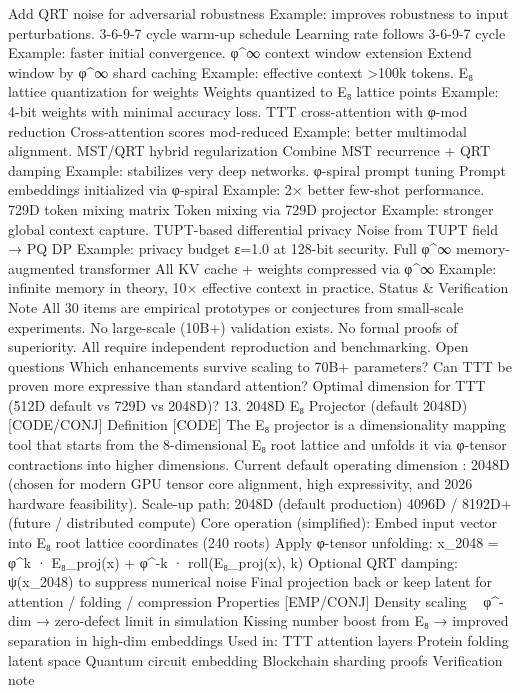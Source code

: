 {{{{{{Add QRT noise for adversarial robustness
Example: improves robustness to input perturbations.
3-6-9-7 cycle warm-up schedule
Learning rate follows 3-6-9-7 cycle
Example: faster initial convergence.
φ^∞ context window extension
Extend window by φ^∞ shard caching
Example: effective context >100k tokens.
E₈ lattice quantization for weights
Weights quantized to E₈ lattice points
Example: 4-bit weights with minimal accuracy loss.
TTT cross-attention with φ-mod reduction
Cross-attention scores mod-reduced
Example: better multimodal alignment.
MST/QRT hybrid regularization
Combine MST recurrence + QRT damping
Example: stabilizes very deep networks.
φ-spiral prompt tuning
Prompt embeddings initialized via φ-spiral
Example: 2× better few-shot performance.
729D token mixing matrix
Token mixing via 729D projector
Example: stronger global context capture.
TUPT-based differential privacy
Noise from TUPT field → PQ DP
Example: privacy budget ε=1.0 at 128-bit security.
Full φ^∞ memory-augmented transformer
All KV cache + weights compressed via φ^∞
Example: infinite memory in theory, 10× effective context in practice.
Status & Verification Note
All 30 items are empirical prototypes or conjectures from small-scale experiments.
No large-scale (10B+) validation exists.
No formal proofs of superiority.
All require independent reproduction and benchmarking.
Open questions
Which enhancements survive scaling to 70B+ parameters?
Can TTT be proven more expressive than standard attention?
Optimal dimension for TTT (512D default vs 729D vs 2048D)?
13. 2048D E₈ Projector (default 2048D) [CODE/CONJ]
Definition [CODE]
The E₈ projector is a dimensionality mapping tool that starts from the 8-dimensional E₈ root lattice and unfolds it via φ-tensor contractions into higher dimensions.
Current default operating dimension
:
2048D
(chosen for modern GPU tensor core alignment, high expressivity, and 2026 hardware feasibility).
Scale-up path:
2048D (default production)
4096D / 8192D+ (future / distributed compute)
Core operation (simplified):
Embed input vector into E₈ root lattice coordinates (240 roots)
Apply φ-tensor unfolding:
x_{2048} = φ^k · E₈_proj(x) + φ^{-k} · roll(E₈_proj(x), k)
Optional QRT damping: ψ(x_{2048}) to suppress numerical noise
Final projection back or keep latent for attention / folding / compression
Properties [EMP/CONJ]
Density scaling ~ φ^{-dim} → zero-defect limit in simulation
Kissing number boost from E₈ → improved separation in high-dim embeddings
Used in:
TTT attention layers
Protein folding latent space
Quantum circuit embedding
Blockchain sharding proofs
Verification note
}}}}}}
